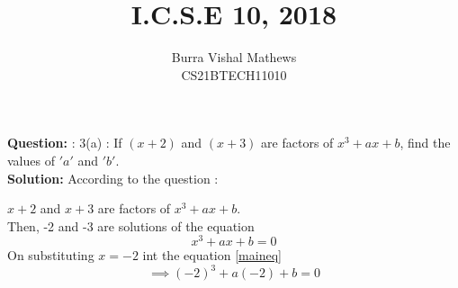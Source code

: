 \documentclass[journal,12pt,twocolumn]{IEEEtran}
\begin{document}



\providecommand{\pr}[1]{\ensuremath{\Pr\left(#1\right)}}
\providecommand{\qfunc}[1]{\ensuremath{Q\left(#1\right)}}
\providecommand{\sbrak}[1]{\ensuremath{{}\left[#1\right]}}
\providecommand{\lsbrak}[1]{\ensuremath{{}\left[#1\right.}}
\providecommand{\rsbrak}[1]{\ensuremath{{}\left.#1\right]}}
\providecommand{\brak}[1]{\ensuremath{\left(#1\right)}}
\providecommand{\lbrak}[1]{\ensuremath{\left(#1\right.}}
\providecommand{\rbrak}[1]{\ensuremath{\left.#1\right)}}
\providecommand{\cbrak}[1]{\ensuremath{\left\{#1\right\}}}
\providecommand{\lcbrak}[1]{\ensuremath{\left\{#1\right.}}
\providecommand{\rcbrak}[1]{\ensuremath{\left.#1\right\}}}
\theoremstyle{remark}
\newtheorem{rem}{Remark}
\newcommand{\sgn}{\mathop{\mathrm{sgn}}}

\providecommand{\system}{\overset{\mathcal{H}}{ \longleftrightarrow}}
\newcommand{\question}{\noindent \textbf{Question: }}	
\newcommand{\solution}{\noindent \textbf{Solution: }}

\providecommand{\dec}[2]{\ensuremath{\overset{#1}{\underset{#2}{\gtrless}}}}

\let\vec\mathbf

\newcommand{\myvec}[1]{\ensuremath{\begin{pmatrix}#1\end{pmatrix}}}
\newcommand{\mydet}[1]{\ensuremath{\begin{vmatrix}#1\end{vmatrix}}}

\vspace{3cm}
\title{I.C.S.E 10, 2018}

\author{ Burra Vishal Mathews\\CS21BTECH11010}
	


\maketitle
\question : 3(a) : 
 If $(x+2)$ and $(x+3)$ are factors of $x^3+ax+b$, find the values of $'a'$ and $'b'$.\\


\solution
    According to the question :

    $x+2$ and $x+3$ are factors of $x^3+ax+b$.\\
    Then, -2 and -3 are solutions of the equation \\
    \begin{equation}
    \label{maineq}
        x^3+ax+b=0 
    \end{equation}
    On substituting $x=-2$  int the equation \eqref{maineq}
        $$\implies \brak{-2}^3+a\brak{-2}+b=0$$ 
\end{document}
